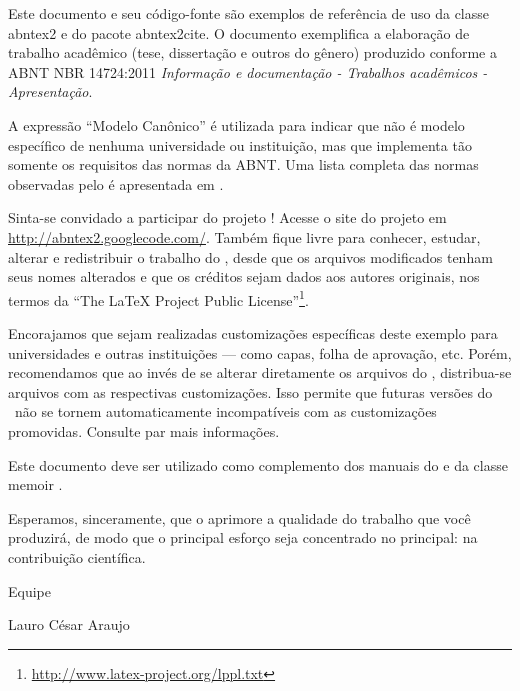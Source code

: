 Este documento e seu código-fonte são exemplos de referência de uso da classe
\textsf{abntex2} e do pacote \textsf{abntex2cite}. O documento
exemplifica a elaboração de trabalho acadêmico (tese, dissertação e outros do
gênero) produzido conforme a ABNT NBR 14724:2011 \emph{Informação e documentação
    - Trabalhos acadêmicos - Apresentação}.

A expressão ``Modelo Canônico'' é utilizada para indicar que \abnTeX{} não é
modelo específico de nenhuma universidade ou instituição, mas que implementa tão
somente os requisitos das normas da ABNT. Uma lista completa das normas
observadas pelo \abnTeX{} é apresentada em \textcite{abntex2classe}.

Sinta-se convidado a participar do projeto \abnTeX{}! Acesse o site do projeto em
\url{http://abntex2.googlecode.com/}. Também fique livre para conhecer,
estudar, alterar e redistribuir o trabalho do \abnTeX{}, desde que os arquivos
modificados tenham seus nomes alterados e que os créditos sejam dados aos
autores originais, nos termos da ``The \LaTeX{} Project Public
License''\footnote{\url{http://www.latex-project.org/lppl.txt}}.

Encorajamos que sejam realizadas customizações específicas deste exemplo para
universidades e outras instituições --- como capas, folha de aprovação, etc.
Porém, recomendamos que ao invés de se alterar diretamente os arquivos do
\abnTeX{}, distribua-se arquivos com as respectivas customizações.
Isso permite que futuras versões do \abnTeX{}~não se tornem automaticamente
incompatíveis com as customizações promovidas. Consulte
\textcite{abntex2-wiki-como-customizar} par mais informações.

Este documento deve ser utilizado como complemento dos manuais do \abnTeX{}
\cite{abntex2classe,abntex2cite,abntex2cite-alf} e da classe \textsf{memoir}
\cite{memoir}.

Esperamos, sinceramente, que o \abnTeX{} aprimore a qualidade do trabalho que
você produzirá, de modo que o principal esforço seja concentrado no principal:
na contribuição científica.

Equipe \abnTeX{}

Lauro César Araujo



